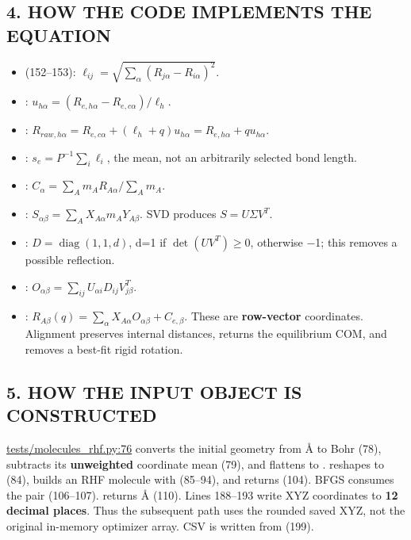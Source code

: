 \documentclass[10pt,a4paper]{article}
\begin{document}
\subsection{4. HOW THE CODE IMPLEMENTS THE EQUATION}
\begin{itemize}
\item {} (152–153): \(\ell_{ij}=\sqrt{\sum_\alpha(R_{j\alpha}-R_{i\alpha})^2}\).
\item {}: \(u_{h\alpha}=(R_{e,h\alpha}-R_{e,c\alpha})/\ell_h\).
\item {}: \(R_{raw,h\alpha}=R_{e,c\alpha}+(\ell_h+q)u_{h\alpha}=R_{e,h\alpha}+qu_{h\alpha}\).
\item {}: \(s_e=P^{-1}\sum_i\ell_i\), the mean, not an arbitrarily selected bond length.
\item {}: \(C_\alpha=\sum_A m_AR_{A\alpha}/\sum_A m_A\).
\item {}: \(S_{\alpha\beta}=\sum_A X_{A\alpha}m_AY_{A\beta}\). SVD produces \(S=U\Sigma V^T\).
\item {}: \(D=\operatorname{diag}(1,1,d)\), d=1 if \(\det(UV^T)\ge0\), otherwise −1; this removes a possible reflection.
\item {}: \(O_{\alpha\beta}=\sum_{ij}U_{\alpha i}D_{ij}V^T_{j\beta}\).
\item {}: \(R_{A\beta}(q)=\sum_\alpha X_{A\alpha}O_{\alpha\beta}+C_{e,\beta}\). These are \textbf{row-vector} coordinates. Alignment preserves internal distances, returns the equilibrium COM, and removes a best-fit rigid rotation.
\end{itemize}
\subsection{5. HOW THE INPUT OBJECT IS CONSTRUCTED}
\href{/Users/novaz/Desktop/qml2.0/tests/molecules\_rhf.py:76}{tests/molecules\_rhf.py:76}  converts the initial geometry from Å to Bohr (78), subtracts its \textbf{unweighted} coordinate mean (79), and flattens  to .  reshapes to  (84), builds an RHF molecule with  (85–94), and returns  (104). BFGS consumes the pair (106–107).  returns Å (110). Lines 188–193 write XYZ coordinates to \textbf{12 decimal places}. Thus the subsequent path uses the rounded saved XYZ, not the original in-memory optimizer array. CSV  is written from  (199).
\end{document}
